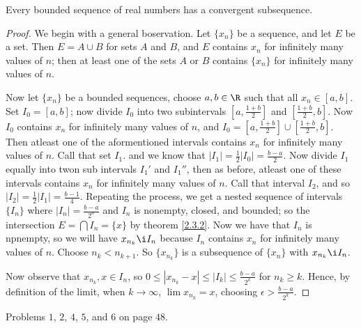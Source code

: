 \begin{theorem}\label{2.3.3}
   Every bounded sequence of real numbers has a convergent subsequence. 
\end{theorem}
\begin{proof}
    We begin with a general boservation. Let $\{x_n\}$ be a sequence, and let  
    $E$ be a set. Then  $E=A \cup B$ for sets $A$ and $B$, and  $E$ contains  
    $x_n$ for infinitely many values of  $n$; then at least one of the sets  $A$ 
    or  $B$ contains $\{x_n\}$ for infinitely many values of $n$.

     Now let  $\{x_n\}$ be a bounded sequences, choose  $a,b \in \R$ such that 
     all  $x_n \in [a,b]$. Set $I_0=[a,b]$; now divide  $I_0$ into two subintervals 
     $[a,\frac{1+b}{2}]$ and $[\frac{1+b}{2},b]$. Now $I_0$ contains  $x_n$ for 
     infinitely many values of  $n$, and  $I_0=[a,\frac{1+b}{2}] \cup 
     [\frac{1+b}{2},b]$. Then atleast one of the aformentioned intervals contains 
     $x_n$ for infinitely many values of  $n$. Call that set  $I_1$. and we know 
     that $|I_1|=\frac{1}{2}|I_0|=\frac{b-a}{2}$. Now divide $I_1$ equally into 
     twon sub intervals $I_1'$ and $I_1''$, then as before, atleast one of these 
     intervals contains $x_n$ for infinitely many values of  $n$. Call that 
     interval  $ I_2$, and so $|I_2|=\frac{1}{2}|I_1|=\frac{b-1}{4}$. Repeating 
     the process, we get a nested sequence of intervals $\{I_n\}$ where  $|I_n|=
     \frac{b-a}{2^n}$ and $I_n$ is nonempty, closed, and bounded; so the 
     intersection  $E=\bigcap I_n=\{x\}$ by theorem \ref{2.3.2}. Now we have that 
     $I_n$ is npnempty, so we will have  $x_{n_k} \i I_n$ because  $I_n$ contains 
     $x_n$ for infinitely many values of  $n$. Choose  $n_k<n_{k+1}$. So  
     $\{x_{n_k}\}$ is a subsequence of  $\{x_n\}$ with  $x_{n_k} \i I_n$.

     Now observe that  $x_{n_k},x \in  I_n$, so  $0 \leq |x_{n_k}-x| \leq |I_k| 
     \leq \frac{b-a}{2^k}$ for $n_k \geq k$. Hence, by definition of the limit, 
     when  $k \rightarrow \infty$,  $\lim{x_{n_k}}=x$, choosing  $\epsilon>
     \frac{b-a}{2^k}$.
\end{proof}

\begin{HW} 
    Problems $1$,  $2$,  $4$,  $5$, and  $6$ on page  $48$.
\end{HW}
